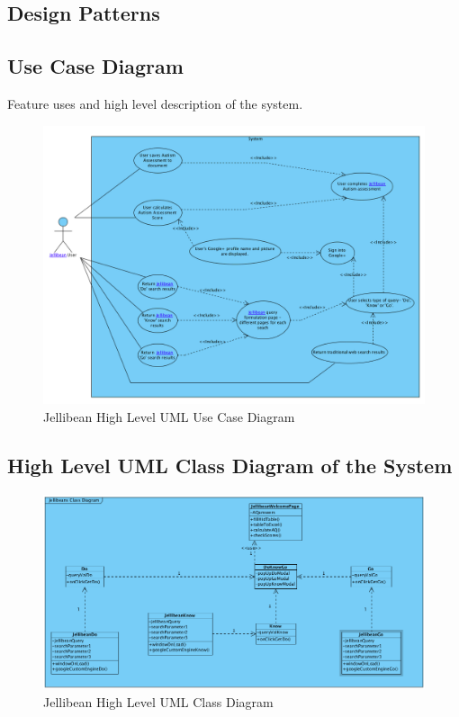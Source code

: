 \documentclass[a4paper, 11pt]{article}
\begin{document}
\subsection{Design Patterns}

\subsection{Use Case Diagram}

Feature uses and high level description of the system.

\begin{figure}[H]
\begin{center}
\includegraphics[scale=0.45]{JBeanUseCase}
\caption{Jellibean High Level UML Use Case Diagram}
\label{JBeanUseCase1}
\end{center}
\end{figure}

\subsection{High Level UML Class Diagram of the System}

\begin{figure}[H]
\begin{center}
\includegraphics[scale=0.45]{jBeanClassDiagram}
\caption{Jellibean High Level UML Class Diagram}
\label{jBeanClassDiagram1}
\end{center}
\end{figure}
\end{document}
